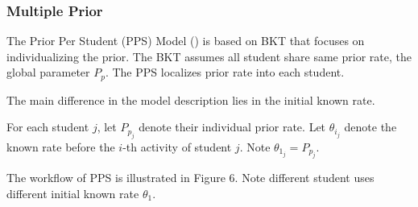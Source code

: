 \documentclass{article}
\begin{document}
\begin{center}
\end{center}

\subsubsection{Multiple Prior}
The Prior Per Student (PPS) Model (\cite{multiprior}) is based on BKT that focuses on individualizing the prior. The BKT assumes all student share same prior rate, the global parameter \( P_p \). The PPS localizes prior rate into each student.

The main difference in the model description lies in the initial known rate.

For each student \( j \), let \( P_{p_j} \) denote their individual prior rate. Let \(\theta_{i_j}\) denote the known rate before the \(i\)-th activity of student \(j\).
Note \(\theta_{1_j} = P_{p_j} \).

The workflow of PPS is illustrated in Figure 6. Note different student uses different initial known rate \(\theta_1\).
\end{document}
